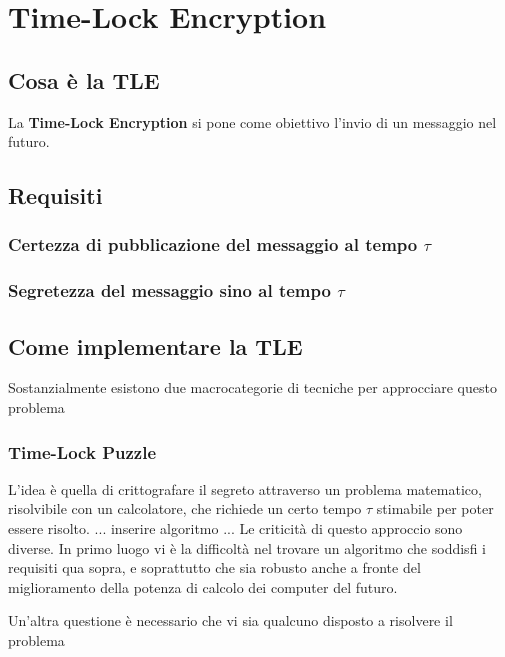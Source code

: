 \chapter{Time-Lock Encryption}

\section{Cosa è la TLE}
La \textbf{Time-Lock Encryption} si pone come obiettivo l'invio di un messaggio
nel futuro.

\section{Requisiti}

\subsection{Certezza di pubblicazione del messaggio al tempo $ \tau $}

\subsection{Segretezza del messaggio sino al tempo $ \tau $}
\label{subsec:segretezza-tle}


\section{Come implementare la TLE}
Sostanzialmente esistono due macrocategorie di tecniche per approcciare questo problema

\subsection{Time-Lock Puzzle}
L'idea è quella di crittografare il segreto attraverso un problema matematico,
risolvibile con un calcolatore, che richiede un certo tempo $ \tau $ stimabile 
per poter essere risolto. 
... inserire algoritmo ...
Le criticità di questo approccio sono diverse. In primo luogo vi è la difficoltà nel
trovare un algoritmo che soddisfi i requisiti qua sopra, e soprattutto che sia robusto
anche a fronte del miglioramento della potenza di calcolo dei computer del futuro.

Un'altra questione è necessario che vi sia qualcuno disposto a risolvere il problema 
